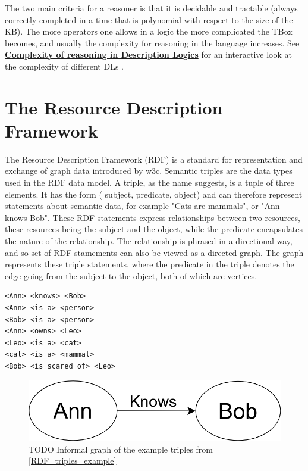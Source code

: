 The two main criteria for a reasoner is that it is decidable and tractable (always correctly completed in a time that is polynomial with respect to the size of the KB). The more operators one allows in a logic the more complicated the TBox becomes, and usually the complexity for reasoning in the language increases. See \href{http://www.cs.man.ac.uk/~ezolin/dl/}{\textbf{Complexity of reasoning in Description Logics}} for an interactive look at the complexity of different DLs \cite{zolin_2013}.

\section{The Resource Description Framework}

The Resource Description Framework (RDF) is a standard for representation and exchange of graph data introduced by \gls{w3c}. Semantic triples are the data types used in the RDF data model. A triple, as the name suggests, is a tuple of three elements. It has the form ( subject, predicate, object) and can therefore represent statements about semantic data, for example "Cats are mammals", or "Ann knows Bob". These RDF statements express relationships between two resources, these resources being the subject and the object, while the predicate encapsulates the nature of the relationship. The relationship is phrased in a directional way, and so set of RDF stamements can also be viewed as a directed graph. The graph represents these triple statements, where the predicate in the triple denotes the edge going from the subject to the object, both of which are vertices.

\begin{lstlisting}[caption={Example of RDF triple set written in informal pseudocode},label={RDF_triples_example}]
<Ann> <knows> <Bob>
<Ann> <is a> <person>
<Bob> <is a> <person>
<Ann> <owns> <Leo>
<Leo> <is a> <cat>
<cat> <is a> <mammal>
<Bob> <is scared of> <Leo>
\end{lstlisting}

\begin{figure}
\centering
    \includegraphics[scale=0.3]{figures/RDF_triple}
    \caption{TODO Informal graph of the example triples from \ref{RDF_triples_example}}
    
    \label{fig:RDF_figure}
\end{figure}

